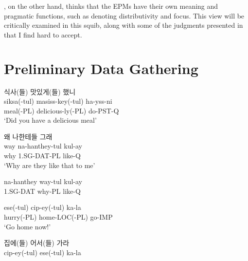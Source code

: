 \documentclass{article}
\begin{document}
\cite{SONG97}, on the other hand, thinks that the EPMs have their own meaning and pragmatic functions, such as denoting distributivity and focus. This view will be critically examined in this squib, along with some of the judgments presented in \cite{SONG97} that I find hard to accept.

\section{Preliminary Data Gathering}

\begin{exe}

\ex
\glll 식사(들) 맛있게(들) 했니 \\
     siksa(-tul) masiss-key(-tul)  ha-yss-ni \\
     meal(-PL)    delicious-ly(-PL) do-PST-Q \\
\trans `Did you have a delicious meal'

\end{exe}

\begin{exe}

\ex \begin{xlist}

\ex
\glll 왜 나한테들 그래 \\ 
     way na-hanthey-tul kul-ay \\
     why 1.SG-DAT-PL like-Q \\
\trans `Why are they like that to me'

\ex
\gll na-hanthey way-tul kul-ay \\
     1.SG-DAT why-PL like-Q \\





\end{xlist}

\end{exe}


\begin{exe}

\ex \begin{xlist}

\ex
\gll ese(-tul) cip-ey(-tul)    ka-la \\
     hurry(-PL) home-LOC(-PL) go-IMP \\
\trans `Go home now!'

\ex 
\gll 집에(들) 어서(들) 가라 \\
     cip-ey(-tul) ese(-tul) ka-la \\

\end{xlist}

\end{exe}
\end{document}
